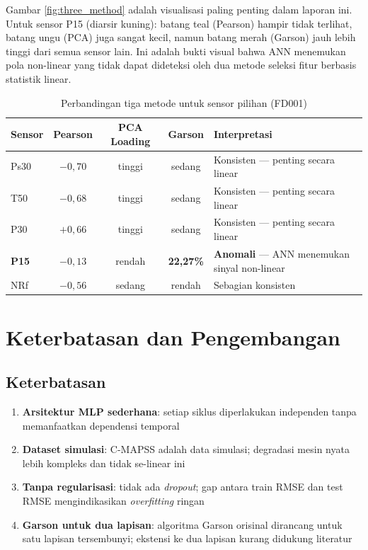 \documentclass[11pt,a4paper]{article}
\begin{document}
Gambar \ref{fig:three_method} adalah visualisasi paling penting
dalam laporan ini. Untuk sensor P15 (diarsir kuning): batang teal
(Pearson) hampir tidak terlihat, batang ungu (PCA) juga sangat kecil,
namun batang merah (Garson) jauh lebih tinggi dari semua sensor lain.
Ini adalah bukti visual bahwa ANN menemukan pola non-linear yang tidak
dapat dideteksi oleh dua metode seleksi fitur berbasis statistik linear.

\begin{table}[H]
\centering\small
\caption{Perbandingan tiga metode untuk sensor pilihan (FD001)}
\label{tab:three_method}
\begin{tabular}{lcccp{5cm}}
\toprule
Sensor & Pearson & PCA Loading & Garson & Interpretasi \\
\midrule
Ps30   & $-0{,}70$ & tinggi & sedang
  & Konsisten --- penting secara linear \\
T50    & $-0{,}68$ & tinggi & sedang
  & Konsisten --- penting secara linear \\
P30    & $+0{,}66$ & tinggi & sedang
  & Konsisten --- penting secara linear \\
\textbf{P15}
       & $-0{,}13$ & rendah & \textbf{22,27\%}
  & \textbf{Anomali} --- ANN menemukan sinyal non-linear \\
NRf    & $-0{,}56$ & sedang & rendah
  & Sebagian konsisten \\
\bottomrule
\end{tabular}
\end{table}

\section{Keterbatasan dan Pengembangan}

\subsection{Keterbatasan}

\begin{enumerate}[noitemsep]
  \item \textbf{Arsitektur MLP sederhana}: setiap siklus diperlakukan
    independen tanpa memanfaatkan dependensi temporal
  \item \textbf{Dataset simulasi}: C-MAPSS adalah data simulasi;
    degradasi mesin nyata lebih kompleks dan tidak se-linear ini
  \item \textbf{Tanpa regularisasi}: tidak ada \textit{dropout};
    gap antara train RMSE dan test RMSE mengindikasikan \textit{overfitting} ringan
  \item \textbf{Garson untuk dua lapisan}: algoritma Garson orisinal
    dirancang untuk satu lapisan tersembunyi; ekstensi ke dua lapisan
    kurang didukung literatur
\end{enumerate}
\end{document}
